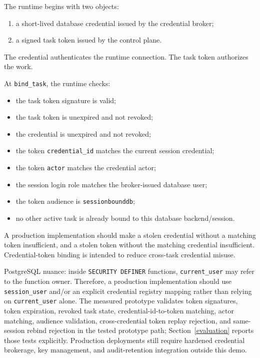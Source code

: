 \documentclass[journal]{IEEEtran}
\providecommand{\tightlist}{%
  \setlength{\itemsep}{0pt}\setlength{\parskip}{0pt}}
\begin{document}
The runtime begins with two objects:

\begin{enumerate}
\def\labelenumi{\arabic{enumi}.}
\tightlist
\item
  a short-lived database credential issued by the credential broker;
\item
  a signed task token issued by the control plane.
\end{enumerate}

The credential authenticates the runtime connection. The task token
authorizes the work.

At \texttt{bind\_task}, the runtime checks:

\begin{itemize}
\tightlist
\item
  the task token signature is valid;
\item
  the task token is unexpired and not revoked;
\item
  the credential is unexpired and not revoked;
\item
  the token \texttt{credential\_id} matches the current session
  credential;
\item
  the token \texttt{actor} matches the credential actor;
\item
  the session login role matches the broker-issued database user;
\item
  the token audience is \texttt{sessionbounddb};
\item
  no other active task is already bound to this database
  backend/session.
\end{itemize}

A production implementation should make a stolen credential without a
matching token insufficient, and a stolen token without the matching
credential insufficient. Credential-token binding is intended to reduce
cross-task credential misuse.

PostgreSQL nuance: inside \texttt{SECURITY\ DEFINER} functions,
\texttt{current\_user} may refer to the function owner. Therefore, a
production implementation should use \texttt{session\_user} and/or an
explicit credential registry mapping rather than relying on
\texttt{current\_user} alone. The measured prototype validates token
signatures, token expiration, revoked task state, credential-id-to-token
matching, actor matching, audience validation, cross-credential token
replay rejection, and same-session rebind rejection in the tested
prototype path; Section~\ref{evaluation} reports those tests explicitly.
Production deployments still require hardened credential brokerage, key
management, and audit-retention integration outside this demo.
\end{document}
